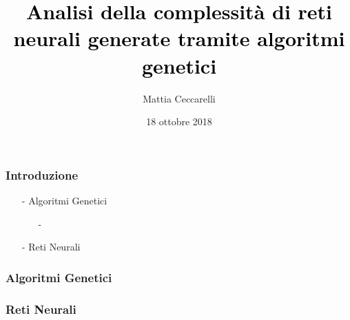 \documentclass{beamer}
\begin{document}
\title{\textcolor{black}{Analisi della complessità di reti neurali generate tramite algoritmi genetici}}
\author{Mattia Ceccarelli}
\date{18 ottobre 2018}

\begin{frame}
 \maketitle
\end{frame}

\begin{frame}
 \frametitle{Introduzione}
 \begin{enumerate}
 \item[-]Algoritmi Genetici
 \begin{enumerate}
 \item[-]
 \end{enumerate}
 \item[-]Reti Neurali
 \end{enumerate}

\end{frame}

\begin{frame}
 \frametitle{Algoritmi Genetici}

\end{frame}
\begin{frame}
 \frametitle{Reti Neurali}
\end{frame}
\end{document}
